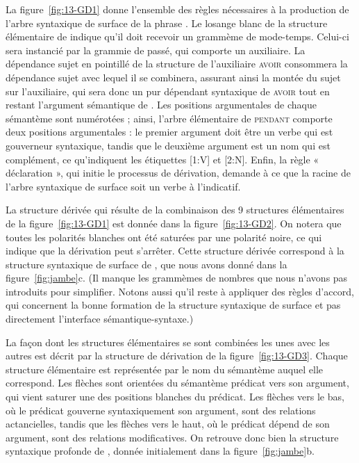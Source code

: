 {La figure~\ref{fig:13-GD1} donne l’ensemble des règles nécessaires à la production de l’arbre syntaxique de surface de la phrase . Le losange blanc de la structure élémentaire de  indique qu’il doit recevoir un grammème de mode-temps. Celui-ci sera instancié par la grammie de passé, qui comporte un auxiliaire. La dépendance sujet en pointillé de la structure de l'auxiliaire \textsc{avoir} consommera la dépendance sujet  avec lequel il se combinera, assurant ainsi la montée du sujet sur l’auxiliaire, qui sera donc un pur dépendant syntaxique de \textsc{avoir} tout en restant l’argument sémantique de . Les positions argumentales de chaque sémantème sont numérotées ; ainsi, l’arbre élémentaire de \textsc{pendant} comporte deux positions argumentales : le premier argument doit être un verbe qui est gouverneur syntaxique, tandis que le deuxième argument est un nom qui est complément, ce qu’indiquent les étiquettes [1{\NoAutoSpacing :}V] et [2{\NoAutoSpacing :}N]. Enfin, la règle « déclaration », qui initie le processus de dérivation, demande à ce que la racine de l’arbre syntaxique de surface soit un verbe à l’indicatif.

La structure dérivée qui résulte de la combinaison des 9 structures élémentaires de la figure~\ref{fig:13-GD1} est donnée dans la figure~\ref{fig:13-GD2}. On notera que toutes les polarités blanches ont été saturées par une polarité noire, ce qui indique que la dérivation peut s’arrêter.
Cette structure dérivée correspond à la structure syntaxique de surface de , que nous avons donné dans la figure~\ref{fig:jambe}c. (Il manque les grammèmes de nombres que nous n'avons pas introduits pour simplifier. Notons aussi qu'il reste à appliquer des règles d'accord, qui concernent la bonne formation de la structure syntaxique de surface et pas directement l'interface sémantique-syntaxe.) 

La façon dont les structures élémentaires se sont combinées les unes avec les autres est décrit par la structure de dérivation de la figure~\ref{fig:13-GD3}. Chaque structure élémentaire est représentée par le nom du sémantème auquel elle correspond.  Les flèches sont orientées du sémantème prédicat vers son argument, qui vient saturer une des positions blanches du prédicat. Les flèches vers le bas, où le prédicat gouverne syntaxiquement son argument, sont des relations actancielles, tandis que les flèches vers le haut, où le prédicat dépend de son argument, sont des relations modificatives. On retrouve donc bien la structure syntaxique profonde de , donnée initialement dans la figure~\ref{fig:jambe}b.\bigskip\\

}
